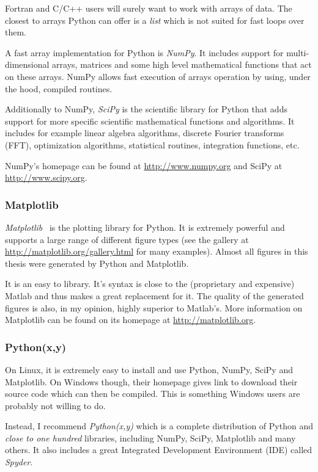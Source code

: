 Fortran and C/C++ users will surely want to work with arrays of data. The closest
to arrays Python can offer is a \textit{list} which is not suited for fast
loops over them.

A fast array implementation for Python is \textit{NumPy}. It includes support
for multi-dimensional arrays, matrices and some high level mathematical functions
that act on these arrays. NumPy allows fast execution of arrays operation by
using, under the hood, compiled routines.

Additionally to NumPy, \textit{SciPy} is the scientific library for Python that
adds support for more specific scientific mathematical functions and algorithms.
It includes for example linear algebra algorithms, discrete Fourier transforms
(FFT), optimization algorithms, statistical routines, integration functions, etc.

NumPy's homepage can be found at \url{http://www.numpy.org} and SciPy at\\
\url{http://www.scipy.org}.


\subsubsection*{Matplotlib}

\textit{Matplotlib}~\cite{matplotlib} is the plotting library for Python. It is extremely powerful
and supports a large range of different figure types (see the gallery
at \url{http://matplotlib.org/gallery.html} for
many examples). Almost all figures in
this thesis were generated by Python and Matplotlib.

It is an easy to library. It's syntax is close to the (proprietary and expensive)
Matlab and thus makes a great replacement for it. The quality of the generated
figures is also, in my opinion, highly superior to Matlab's.
More information on Matplotlib can be found on its homepage at
\url{http://matplotlib.org}.


\subsubsection*{Python(x,y)}

On Linux, it is extremely easy to install and use Python, NumPy, SciPy and
Matplotlib. On Windows though, their homepage gives link to download their
source code which can then be compiled. This is something Windows users are
probably not willing to do.

Instead, I recommend \textit{Python(x,y)} which is a complete distribution of
Python and \textit{close to one hundred} libraries, including NumPy, SciPy,
Matplotlib and many others. It also includes a great Integrated Development
Environment (IDE) called \textit{Spyder}.

